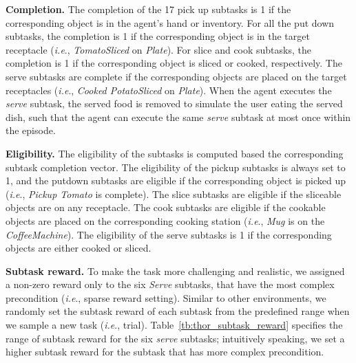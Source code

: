\documentclass{article} \usepackage{iclr2020_conference,times}
\makeatletter
\DeclareRobustCommand\onedot{\futurelet\@let@token\@onedot}
\def\onedot{.}
\def\ie{\emph{i.e}\onedot} \def\Ie{\emph{I.e}\onedot}
\makeatother
\begin{document}
\textbf{Completion.}
The completion of the 17 pick up subtasks is 1 if the corresponding object is in the agent's hand or inventory. For all the put down subtasks, the completion is 1 if the corresponding object is in the target receptacle (\ie, \emph{TomatoSliced} on \emph{Plate}). For slice and cook subtasks, the completion is 1 if the corresponding object is sliced or cooked, respectively. The serve subtasks are complete if the corresponding objects are placed on the target receptacles (\ie, \emph{Cooked PotatoSliced} on \emph{Plate}). When the agent executes the \textit{serve} subtask, the served food is removed to simulate the user eating the served dish, such that the agent can execute the same \textit{serve} subtask at most once within the episode.

\textbf{Eligibility.}
The eligibility of the subtasks is computed based the corresponding subtask completion vector. The eligibility of the pickup subtasks is always set to 1, and the putdown subtasks are eligible if the corresponding object is picked up (\ie, \emph{Pickup Tomato} is complete). The slice subtasks are eligible if the sliceable objects are on any receptacle. The cook subtasks are eligible if the cookable objects are placed on the corresponding cooking station (\ie, \emph{Mug} is on the \emph{CoffeeMachine}). The eligibility of the serve subtasks is 1 if the corresponding objects are either cooked or sliced.


\textbf{Subtask reward.}
To make the task more challenging and realistic, we assigned a non-zero reward only to the six \textit{Serve} subtasks, that have the most complex precondition (\ie, sparse reward setting). Similar to other environments, we randomly set the subtask reward of each subtask from the predefined range when we sample a new task (\ie, trial). Table~\ref{tb:thor_subtask_reward} specifies the range of subtask reward for the six \textit{serve} subtasks; intuitively speaking, we set a higher subtask reward for the subtask that has more complex precondition.
\end{document}
